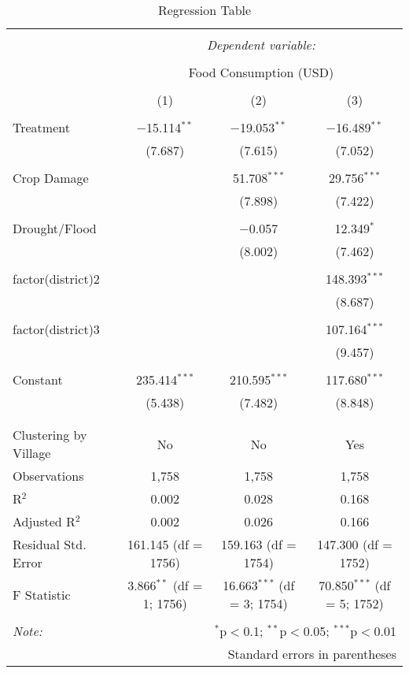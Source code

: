 
\begin{table}[!htbp] \centering 
  \caption{Regression Table} 
  \label{} 
\begin{tabular}{@{\extracolsep{5pt}}lccc} 
\\[-1.8ex]\hline 
\hline \\[-1.8ex] 
 & \multicolumn{3}{c}{\textit{Dependent variable:}} \\ 
\cline{2-4} 
\\[-1.8ex] & \multicolumn{3}{c}{Food Consumption (USD)} \\ 
\\[-1.8ex] & (1) & (2) & (3)\\ 
\hline \\[-1.8ex] 
 Treatment & $-$15.114$^{**}$ & $-$19.053$^{**}$ & $-$16.489$^{**}$ \\ 
  & (7.687) & (7.615) & (7.052) \\ 
  & & & \\ 
 Crop Damage &  & 51.708$^{***}$ & 29.756$^{***}$ \\ 
  &  & (7.898) & (7.422) \\ 
  & & & \\ 
 Drought/Flood &  & $-$0.057 & 12.349$^{*}$ \\ 
  &  & (8.002) & (7.462) \\ 
  & & & \\ 
 factor(district)2 &  &  & 148.393$^{***}$ \\ 
  &  &  & (8.687) \\ 
  & & & \\ 
 factor(district)3 &  &  & 107.164$^{***}$ \\ 
  &  &  & (9.457) \\ 
  & & & \\ 
 Constant & 235.414$^{***}$ & 210.595$^{***}$ & 117.680$^{***}$ \\ 
  & (5.438) & (7.482) & (8.848) \\ 
  & & & \\ 
\hline \\[-1.8ex] 
Clustering by Village & No & No & Yes \\ 
Observations & 1,758 & 1,758 & 1,758 \\ 
R$^{2}$ & 0.002 & 0.028 & 0.168 \\ 
Adjusted R$^{2}$ & 0.002 & 0.026 & 0.166 \\ 
Residual Std. Error & 161.145 (df = 1756) & 159.163 (df = 1754) & 147.300 (df = 1752) \\ 
F Statistic & 3.866$^{**}$ (df = 1; 1756) & 16.663$^{***}$ (df = 3; 1754) & 70.850$^{***}$ (df = 5; 1752) \\ 
\hline 
\hline \\[-1.8ex] 
\textit{Note:}  & \multicolumn{3}{r}{$^{*}$p$<$0.1; $^{**}$p$<$0.05; $^{***}$p$<$0.01} \\ 
 & \multicolumn{3}{r}{Standard errors in parentheses} \\ 
\end{tabular} 
\end{table} 
